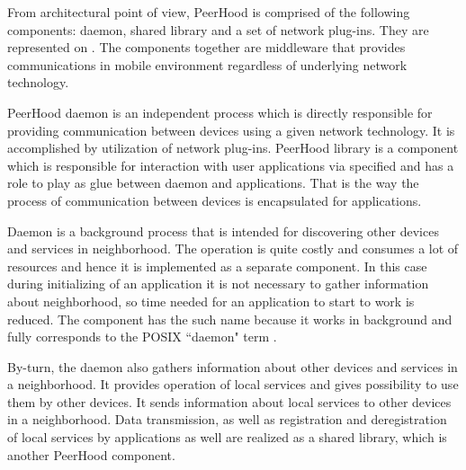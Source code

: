 %
From architectural point of view, PeerHood is comprised of the following components: daemon, shared library and a set of network plug-ins. 
%
They are represented on . 
%
The components together are middleware that provides communications in mobile  environment regardless of underlying network technology. 


%
PeerHood daemon is an independent process which is directly responsible for providing communication between devices using a given network technology. 
%
It is accomplished by utilization of network plug-ins. 
%
PeerHood library is a component which is responsible for interaction with user applications via specified  and has a role to play as glue between daemon and applications. 
%
That is the way the process of communication between devices is encapsulated for applications. 



%
Daemon is a background process that is intended for discovering other devices and services in neighborhood. 
%
The operation is quite costly and consumes a lot of resources and hence it is implemented as a separate component. 
%
In this case during initializing of an application it is not necessary to gather information about neighborhood, so time needed for an application to start to work is reduced. 
%
The component has the such name because it works in background and fully corresponds to the POSIX ``daemon" term . 

%
By-turn, the daemon also gathers information about other devices and services in a neighborhood. 
%
It provides operation of local services and gives possibility to use them by other devices. 
%
It sends information about local services to other devices in a neighborhood. 
%
Data transmission, as well as registration and deregistration of local services by applications as well are realized as a shared library, which is another PeerHood component. 



